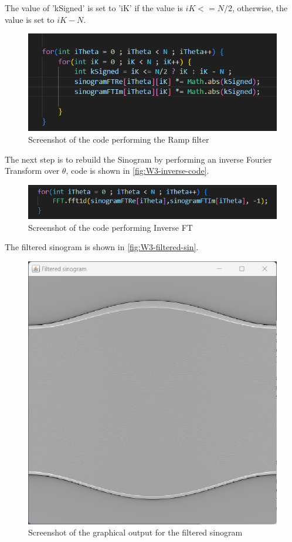 The value of 'kSigned' is set to 'iK' if the value is $iK <= N/2$, otherwise, the value is set to $iK-N$.

\begin{figure}[H] 
    \centering
    \includegraphics[width=0.9\columnwidth]{Figures/Week 3/ramp-filter-code.png}
    \caption{Screenshot of the code performing the Ramp filter}
    \label{fig:W3-ramp-code}
\end{figure}

The next step is to rebuild the Sinogram by performing an inverse Fourier Transform over \(\theta\), code is shown in \autoref{fig:W3-inverse-code}.

\begin{figure}[H] 
    \centering
    \includegraphics[width=0.9\columnwidth]{Figures/Week 3/inverse-FT.png}
    \caption{Screenshot of the code performing Inverse FT }
    \label{fig:W3-inverse-code}
\end{figure}

The filtered sinogram is shown in \autoref{fig:W3-filtered-sin}.
\begin{figure}[H] 
    \centering
    \includegraphics[width=0.9\columnwidth]{Figures/Week 3/filtered-sinorgram.png}
    \caption{Screenshot of the graphical output for the filtered sinogram}
    \label{fig:W3-filtered-sin}
\end{figure}

